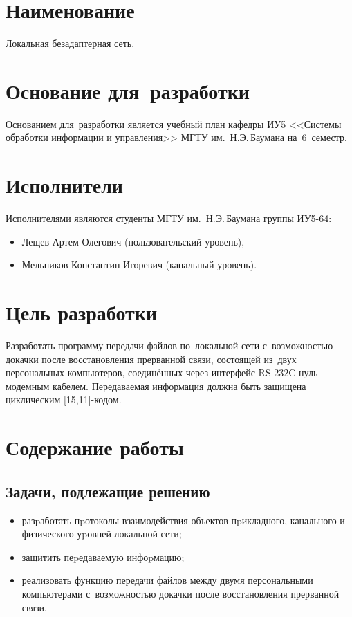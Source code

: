 \documentclass[a4paper,12pt]{article}
\begin{document}

\section{Наименование}
Локальная безадаптерная сеть.

\section{Основание для~разработки}
Основанием для~разработки является учебный план кафедры ИУ5 <<Системы обработки информации и управления>> МГТУ им.~Н.Э.\,Баумана на~6~семестр.

\section{Исполнители}
Исполнителями являются студенты МГТУ им.~Н.Э.\,Баумана группы ИУ5-64:
\begin{itemize}
\item Лещев Артем Олегович (пользовательский уровень),
\item Мельников Константин Игоревич (канальный уровень).
\end{itemize}

\section{Цель разработки}
Разработать программу передачи файлов по~локальной сети с~возможностью докачки после восстановления прерванной связи, состоящей из~двух персональных компьютеров, соединённых через интерфейс RS-232C нуль-модемным кабелем. Передаваемая информация должна быть защищена циклическим [15,11]-кодом.

\section{Содержание работы}
\subsection{Задачи, подлежащие решению}
\begin{itemize}
\item разpаботать пpотоколы взаимодействия объектов пpикладного, канального и физического уpовней локальной сети;
\item защитить пеpедаваемую инфоpмацию;
\item реализовать функцию передачи файлов между двумя персональными компьютерами с~возможностью докачки после восстановления прерванной связи.
\end{itemize}
\end{document}
